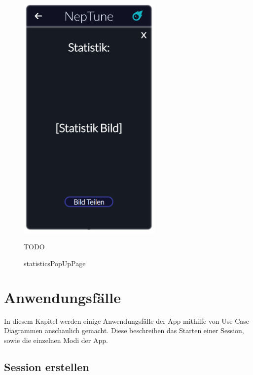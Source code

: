 \documentclass[oneside, ngerman]{sdqtechreport}
\begin{document}
\begin{figure}
    \hypertarget{statisticsPopUpPage}{}
    \begin{minipage}[t]{7 cm}
        \vspace{-1.5ex}
        \includegraphics[width=7cm]{LATEX/Pflichtenheft/GraphicDesigns/statisticsPopUpPage.png}
        \caption{statisticsPopUpPage}
    \end{minipage}
    \hspace{1cm}
    \begin{minipage}[t]{7 cm}
        \vspace{1cm}
        TODO
    \end{minipage}
\end{figure}


\chapter{Anwendungsfälle}
\label{chap:Anwendungsfälle}

In diesem Kapitel werden einige Anwendungsfälle der App mithilfe von Use Case Diagrammen anschaulich gemacht. Diese beschreiben das Starten einer Session, sowie die einzelnen Modi der App.

\section{Session erstellen}
\label{sec:Anwendungsfälle:Session erstellen}
\end{document}

